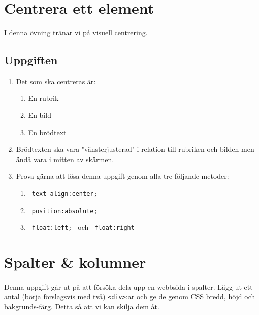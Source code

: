 \documentclass{article}
\begin{document}
  \newpage
  \section{ Centrera ett element }
    \paragraph{}
    I denna övning tränar vi på visuell centrering.

    \subsection*{Uppgiften}
      \begin{enumerate}
        \item
          Det som ska centreras är:
          \begin{enumerate}
            \item En rubrik
            \item En bild
            \item En brödtext
          \end{enumerate}
        \item Brödtexten ska vara "vänsterjusterad" i relation till rubriken och bilden men ändå vara i mitten av skärmen.
        \item Prova gärna att lösa denna uppgift genom alla tre följande metoder:
          \begin{enumerate}
            \item \texttt{ text-align:center; }
            \item \texttt{ position:absolute; }
            \item \texttt{ float:left; } och \texttt{ float:right }
          \end{enumerate}
      \end{enumerate}


  \newpage
  \section{ Spalter \& kolumner }
    \paragraph{}
    Denna uppgift går ut på att försöka dela upp en webbsida i spalter. Lägg ut ett antal (börja förslagsvis med två) \texttt{<div>}:ar och ge de genom CSS bredd, höjd och bakgrunds-färg. Detta så att vi kan skilja dem åt.
\end{document}
